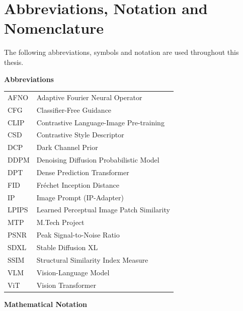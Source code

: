 \chapter*{Abbreviations, Notation and Nomenclature}

\noindent The following abbreviations, symbols and notation are used throughout this thesis.

\bigskip
\noindent\textbf{Abbreviations}

\bigskip
\begin{tabular}{@{}ll@{}}
AFNO    & Adaptive Fourier Neural Operator \\
CFG     & Classifier-Free Guidance \\
CLIP    & Contrastive Language-Image Pre-training \\
CSD     & Contrastive Style Descriptor \\
DCP     & Dark Channel Prior \\
DDPM    & Denoising Diffusion Probabilistic Model \\
DPT     & Dense Prediction Transformer \\
FID     & Fr\'{e}chet Inception Distance \\
IP      & Image Prompt (IP-Adapter) \\
LPIPS   & Learned Perceptual Image Patch Similarity \\
MTP     & M.Tech Project \\
PSNR    & Peak Signal-to-Noise Ratio \\
SDXL    & Stable Diffusion XL \\
SSIM    & Structural Similarity Index Measure \\
VLM     & Vision-Language Model \\
ViT     & Vision Transformer \\
\end{tabular}

\clearpage
\noindent\textbf{Mathematical Notation}

